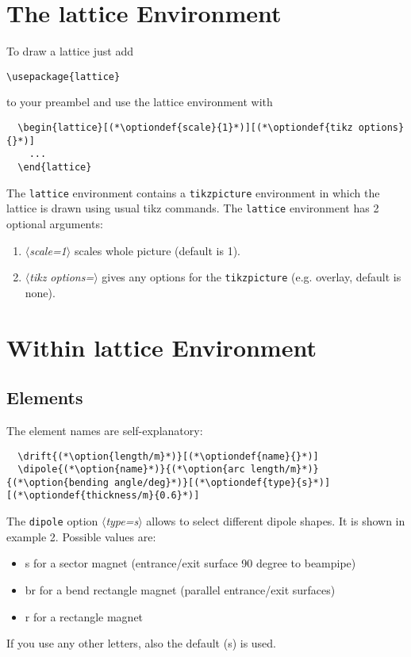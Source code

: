 \documentclass[a4paper]{scrartcl}
\newcommand{\option}[1]{{\color{blue}$\langle$\textit{#1}$\rangle$}}
\newcommand{\optiondef}[2]{{\color{green!50!black}$\langle$\textit{#1=#2}$\rangle$}}
\begin{document}
\section{The lattice Environment}
\label{sec-4}

To draw a lattice just add
\begin{lstlisting}
\usepackage{lattice}
\end{lstlisting}
to your preambel and use the lattice environment with
\begin{lstlisting}
  \begin{lattice}[(*\optiondef{scale}{1}*)][(*\optiondef{tikz options}{}*)]
    ...
  \end{lattice}
\end{lstlisting}
The \lstinline+lattice+ environment contains a \lstinline+tikzpicture+ environment in
which the lattice is drawn using usual tikz commands. The \lstinline+lattice+ environment
has 2 optional arguments:
\begin{enumerate}
\item \optiondef{scale}{1} scales whole picture (default is 1).
\item \optiondef{tikz options}{} gives any options for the \lstinline+tikzpicture+ (e.g.
  overlay, default is none).
\end{enumerate}


\section{Within lattice Environment}
\label{sec-5}

\subsection{Elements}
\label{sec-5-1}
 The element names are self-explanatory:

\begin{lstlisting}
  \drift{(*\option{length/m}*)}[(*\optiondef{name}{}*)]
  \dipole{(*\option{name}*)}{(*\option{arc length/m}*)}{(*\option{bending angle/deg}*)}[(*\optiondef{type}{s}*)][(*\optiondef{thickness/m}{0.6}*)]
\end{lstlisting}
The \lstinline+dipole+ option \optiondef{type}{s} allows to select different dipole
shapes. It is shown in example 2. Possible values are:
\begin{itemize}
\item s for a sector magnet (entrance/exit surface 90 degree to beampipe)
\item br for a bend rectangle magnet (parallel entrance/exit surfaces)
\item r for a rectangle magnet
\end{itemize}
If you use any other letters, also the default (s) is used.
\end{document}
